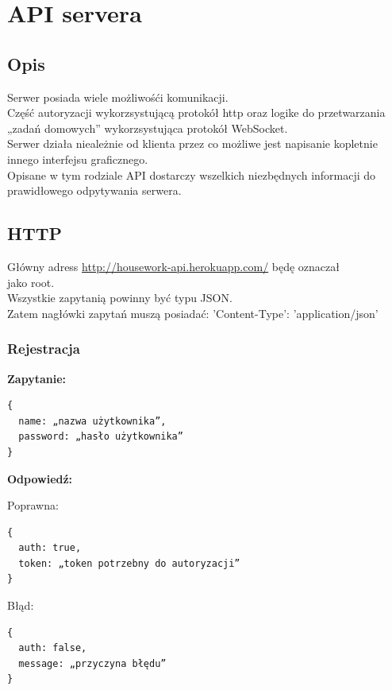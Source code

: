 \documentclass[12pt,a4paper]{article}  %
\begin{document}
	\section{API servera}
	\subsection{Opis}
	Serwer posiada wiele możliwośći komunikacji. \\
	Część autoryzacji wykorzsystującą protokół http oraz logike do przetwarzania „zadań domowych” wykorzsystująca protokół WebSocket. \\
	Serwer działa nieależnie od klienta przez co możliwe jest napisanie kopletnie innego interfejsu graficznego. \\
	Opisane w tym rodziale API dostarczy wszelkich niezbędnych informacji do prawidłowego odpytywania serwera.
	\subsection{HTTP}
	Główny adress \url{http://housework-api.herokuapp.com/} będę oznaczał \\ jako root. \\
	Wszystkie zapytanią powinny być typu JSON. \\
	Zatem nagłówki zapytań muszą posiadać: 'Content-Type': 'application/json'
	\newpage
	\subsubsection{Rejestracja} 
	
\begin{flushleft}
\textbf{Zapytanie:}
\begin{verbatim}
{
  name: „nazwa użytkownika”,
  password: „hasło użytkownika”
}
\end{verbatim}
\textbf{Odpowiedź:}

Poprawna:
\begin{verbatim}
{
  auth: true,
  token: „token potrzebny do autoryzacji”
}
\end{verbatim}

Błąd:
\begin{verbatim}
{
  auth: false,
  message: „przyczyna błędu”
}
\end{verbatim}
\end{flushleft}

\newpage
\end{document}
